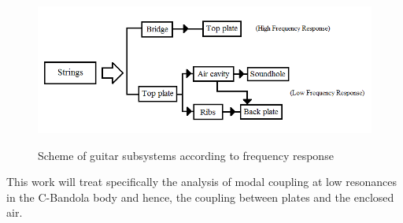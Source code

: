 \begin{figure}[h]
\centering
\includegraphics[height=5cm]{img/GuitarScheme.png}
\caption{Scheme of guitar subsystems according to frequency response}
\label{GuitarScheme}
\end{figure}

This work will treat specifically the analysis of modal coupling at low resonances in the C-Bandola body and hence, the coupling between plates and the enclosed air. 